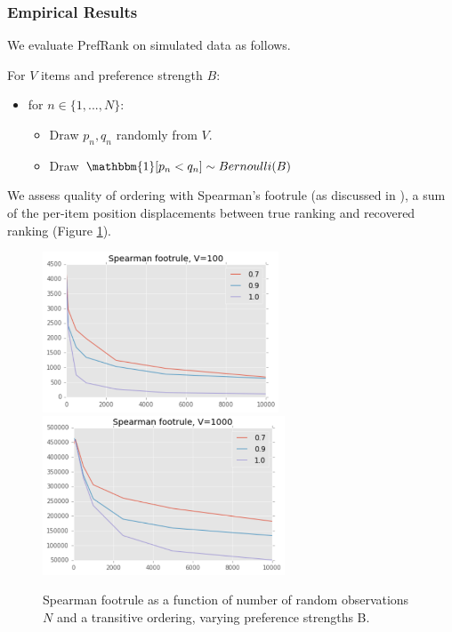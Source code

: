 \subsubsection{Empirical Results}

We evaluate PrefRank on simulated data as follows.

For $V$ items and preference strength $B$:

\begin{itemize}
	\item for $n \in \{1, ..., N\}$:
	\begin{itemize}
		\item Draw $p_n, q_n$ randomly from $V$.
		\item Draw $\mathbbm{1}[p_n < q_n] \sim Bernoulli(B)$
	\end{itemize}
\end{itemize}

We assess quality of ordering with Spearman's footrule (as discussed in \cite{jordan}), a sum of the per-item position displacements between true ranking and recovered ranking (Figure \ref{fig:pr_0}).

\begin{figure}[!htb]
\includegraphics[width=	7cm]{images/pr_100}
\hfill
\includegraphics[width=7.2cm]{images/pr_1000}
\caption{Spearman footrule as a function of number of random observations $N$ and a transitive ordering, varying preference strengths B.}
\label{fig:pr_0} 
\end{figure}


